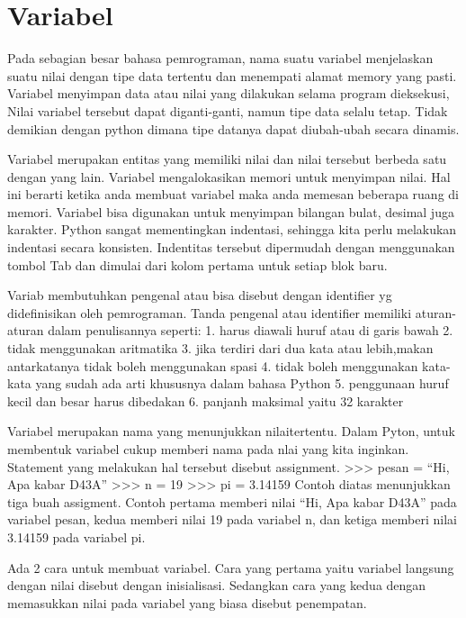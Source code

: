 
\section{Variabel}
Pada sebagian besar bahasa pemrograman, nama suatu variabel
menjelaskan suatu nilai dengan tipe data tertentu 
dan menempati alamat memory yang pasti.
Variabel menyimpan data atau nilai yang dilakukan selama program dieksekusi,
Nilai variabel tersebut dapat diganti-ganti, namun tipe data selalu tetap.
Tidak demikian dengan python dimana tipe datanya dapat diubah-ubah
secara dinamis\cite{suparno2013komputasi}.

Variabel merupakan entitas yang memiliki nilai dan nilai tersebut berbeda satu dengan yang lain. Variabel mengalokasikan memori untuk menyimpan nilai.
Hal ini berarti ketika anda membuat variabel maka anda memesan beberapa ruang di memori. 
Variabel bisa digunakan untuk menyimpan bilangan bulat, desimal juga karakter.
Python sangat mementingkan indentasi, sehingga kita perlu melakukan indentasi secara konsisten. 
Indentitas tersebut dipermudah dengan menggunakan tombol Tab dan dimulai dari kolom pertama untuk setiap blok baru.

Variab membutuhkan pengenal atau bisa disebut dengan identifier yg didefinisikan oleh pemrograman. Tanda pengenal atau identifier memiliki aturan-aturan dalam penulisannya seperti:
1. harus diawali huruf atau di garis bawah
2. tidak menggunakan aritmatika
3. jika terdiri dari dua kata atau lebih,makan antarkatanya tidak boleh menggunakan spasi
4. tidak boleh menggunakan kata-kata yang sudah ada arti khususnya dalam bahasa Python
5. penggunaan huruf kecil dan besar harus dibedakan
6. panjanh maksimal yaitu 32 karakter

Variabel merupakan nama yang menunjukkan nilaitertentu. Dalam Pyton, untuk membentuk variabel cukup memberi nama pada nlai yang kita inginkan. Statement yang melakukan hal tersebut disebut assignment.
>>> pesan = “Hi, Apa kabar D43A”
>>> n = 19
>>> pi = 3.14159
Contoh diatas menunjukkan tiga buah assigment. Contoh pertama memberi nilai “Hi, Apa kabar D43A” pada variabel pesan, kedua memberi nilai 19 pada variabel n, dan ketiga memberi nilai 3.14159 pada variabel pi.\cite{utami2004logika}

Ada 2 cara untuk membuat variabel. Cara yang pertama yaitu variabel langsung dengan nilai disebut dengan inisialisasi. Sedangkan cara yang kedua dengan memasukkan nilai pada variabel yang biasa disebut penempatan.\cite{santoso2009bahasa}

